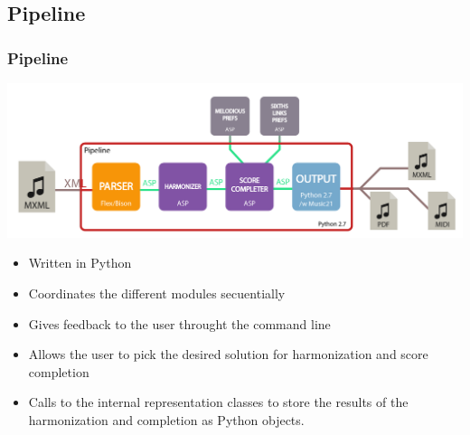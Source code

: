 \documentclass[english,handout]{beamer}
\begin{document}
\subsection{Pipeline}
	\begin{frame}[t]
	\frametitle{Pipeline}
	\begin{center}
			\includegraphics[width=0.6\linewidth]{imagenes/arch_trans/arquitectura_final_pipe-01.png}
			\end{center}
		\begin{itemize}
			\item Written in \alert{Python}
			\pause
			\item Coordinates the different modules secuentially
			\item \alert{Gives feedback} to the user throught the command line
			\pause
			\item Allows the user to pick the desired solution for harmonization and score completion
			\pause
			\item Calls to the \alert{internal representation classes} to store the results of the harmonization and completion as Python objects.
		\end{itemize}
	\end{frame}
\end{document}
